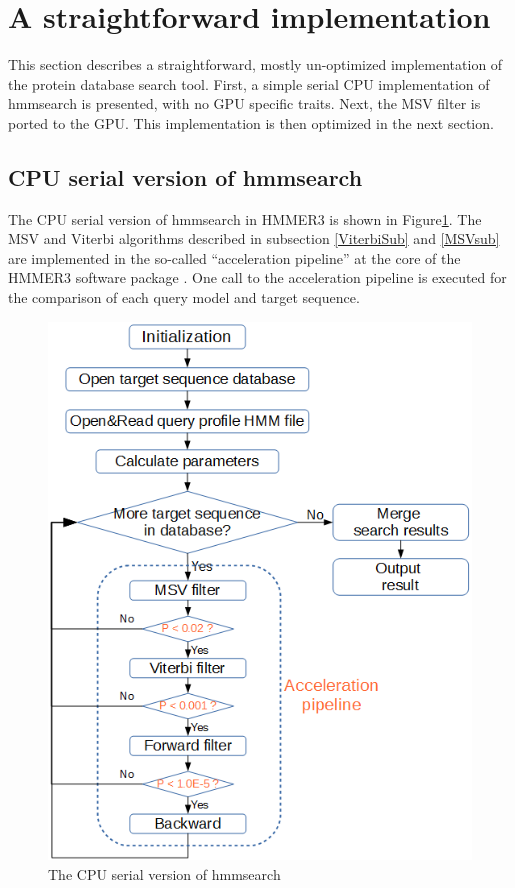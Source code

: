 
\section{A straightforward implementation}

This section describes a straightforward, mostly un-optimized implementation of the protein database search tool. First, a simple serial CPU implementation of hmmsearch is presented, with no GPU specific traits. Next, the MSV filter is ported to the GPU. This implementation is then optimized in the next section.

\subsection{CPU serial version of hmmsearch}

The CPU serial version of hmmsearch in HMMER3 is shown in Figure\ref{fig:hmmsearch}. The MSV and Viterbi algorithms described in subsection \ref{ViterbiSub} and \ref{MSVsub} are implemented in the so-called “acceleration pipeline” at the core of the HMMER3 software package \citep{HMMER3}. One call to the acceleration pipeline is executed for the comparison of each query model and target sequence.

\begin{figure}[!htb]
 \centering
 \includegraphics[totalheight=0.5\textheight]{Figures/hmmsearch.png}
 \caption{\selectfont The CPU serial version of hmmsearch}
 \label{fig:hmmsearch}
\end{figure}

